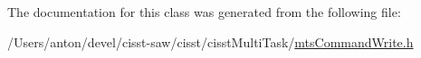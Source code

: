 The documentation for this class was generated from the following file\+:\begin{DoxyCompactItemize}
\item 
/\+Users/anton/devel/cisst-\/saw/cisst/cisst\+Multi\+Task/\hyperlink{mts_command_write_8h}{mts\+Command\+Write.\+h}\end{DoxyCompactItemize}
